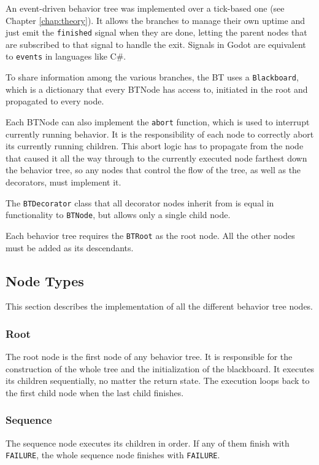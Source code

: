 An event-driven behavior tree was implemented over a tick-based one (see Chapter \ref{chap:theory}). It allows the branches to manage their own uptime and just emit the \texttt{finished} signal when they are done, letting the parent nodes that are subscribed to that signal to handle the exit. Signals in Godot are equivalent to \texttt{events} in languages like C\#.

To share information among the various branches, the BT uses a \texttt{Blackboard}, which is a dictionary that every BTNode has access to, initiated in the root and propagated to every node.

Each BTNode can also implement the \texttt{abort} function, which is used to interrupt currently running behavior. It is the responsibility of each node to correctly abort its currently running children. This abort logic has to propagate from the node that caused it all the way through to the currently executed node farthest down the behavior tree, so any nodes that control the flow of the tree, as well as the decorators, must implement it. 

The \texttt{BTDecorator} class that all decorator nodes inherit from is equal in functionality to \texttt{BTNode}, but allows only a single child node.

Each behavior tree requires the \texttt{BTRoot} as the root node. All the other nodes must be added as its descendants.


\subsection{Node Types}
This section describes the implementation of all the different behavior tree nodes.

\subsubsection{Root}
The root node is the first node of any behavior tree. It is responsible for the construction of the whole tree and the initialization of the blackboard. It executes its children sequentially, no matter the return state. The execution loops back to the first child node when the last child finishes.

\subsubsection{Sequence}
The sequence node executes its children in order. If any of them finish with \texttt{FAILURE}, the whole sequence node finishes with \texttt{FAILURE}.

